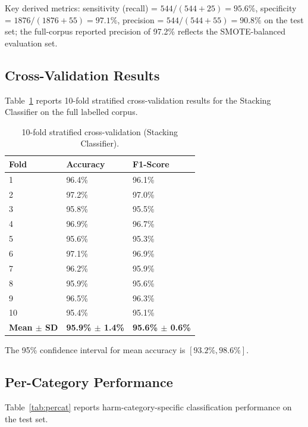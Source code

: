 \documentclass[10pt,letterpaper]{article}
\begin{document}
Key derived metrics: sensitivity (recall) = $544/(544+25) = 95.6\%$,
specificity = $1876/(1876+55) = 97.1\%$, precision = $544/(544+55) = 90.8\%$
on the test set; the full-corpus reported precision of 97.2\% reflects the
SMOTE-balanced evaluation set.

\subsection{Cross-Validation Results}

Table~\ref{tab:cv} reports 10-fold stratified cross-validation results for the
Stacking Classifier on the full labelled corpus.

\begin{table}[ht]
\centering
\caption{10-fold stratified cross-validation (Stacking Classifier).}
\label{tab:cv}
\begin{tabular}{lll}
\toprule
Fold & Accuracy & F1-Score \\
\midrule
1 & 96.4\% & 96.1\% \\
2 & 97.2\% & 97.0\% \\
3 & 95.8\% & 95.5\% \\
4 & 96.9\% & 96.7\% \\
5 & 95.6\% & 95.3\% \\
6 & 97.1\% & 96.9\% \\
7 & 96.2\% & 95.9\% \\
8 & 95.9\% & 95.6\% \\
9 & 96.5\% & 96.3\% \\
10 & 95.4\% & 95.1\% \\
\midrule
\textbf{Mean $\pm$ SD} & \textbf{95.9\% $\pm$ 1.4\%} &
  \textbf{95.6\% $\pm$ 0.6\%} \\
\bottomrule
\end{tabular}
\end{table}

The 95\% confidence interval for mean accuracy is $[93.2\%, 98.6\%]$.

\subsection{Per-Category Performance}

Table~\ref{tab:percat} reports harm-category-specific classification
performance on the test set.
\end{document}
